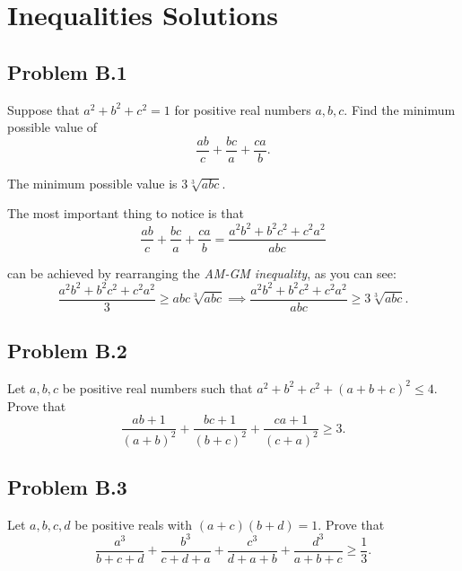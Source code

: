 \documentclass[12pt]{article}
\begin{document}
  \clearpage

  \section{\textsf{Inequalities Solutions}}
    \subsection{Problem B.1}
      \begin{tcolorbox}[problembox]
         Suppose that $a^2 + b^2 + c^2 = 1$ for positive real numbers $a, b, c$. Find the minimum possible value of
          \[
            \frac{ab}{c} + \frac{bc}{a} + \frac{ca}{b}.
          \]
      \end{tcolorbox}
      The minimum possible value is $3\sqrt[3]{abc}$.

      The most important thing to notice is that
      \[
        \frac{ab}{c} + \frac{bc}{a} + \frac{ca}{b} = \frac{a^2b^2 + b^2c^2 + c^2a^2}{abc}
      \]
      
      can be achieved by rearranging the \textit{AM-GM inequality}, as you can see:
      \[
        \frac{a^2b^2 + b^2c^2 + c^2a^2}{3} \ge abc\sqrt[3]{abc} \implies \frac{a^2b^2 + b^2c^2 + c^2a^2}{abc} \ge 3\sqrt[3]{abc}.
      \]

    \clearpage

    \subsection{Problem B.2}
      \begin{tcolorbox}[problembox]
         Let $a, b, c$ be positive real numbers such that $a^2 + b^2 + c^2 + (a+b+c)^2 \le 4$. Prove that
          \[
            \frac{ab + 1}{(a+b)^2} + \frac{bc + 1}{(b+c)^2} + \frac{ca + 1}{(c+a)^2} \ge 3.
          \]
      \end{tcolorbox}

    \clearpage

    \subsection{Problem B.3}
      \begin{tcolorbox}[problembox]
         Let $a, b, c, d$ be positive reals with $(a+c)(b+d) = 1$. Prove that
          \[
            \frac{a^3}{b+c+d} + \frac{b^3}{c+d+a} + \frac{c^3}{d+a+b} + \frac{d^3}{a+b+c} \ge \frac13.
          \]
      \end{tcolorbox}
\end{document}
